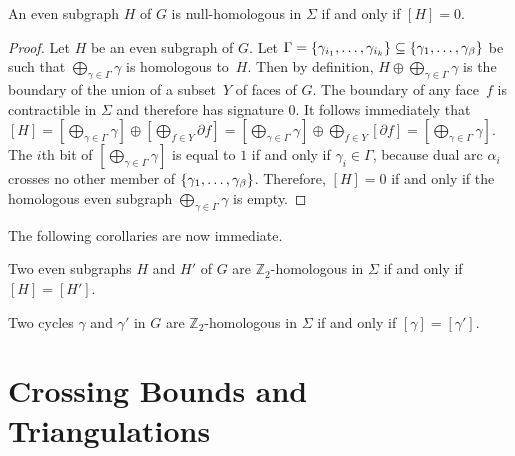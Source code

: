 \documentclass[letterpaper,review]{siamart190516}
\def\Z{\mathbb{Z}}
\def\cycle{\gamma}
\def\dualarc{\alpha}
\def\rnote#1{\color{red}Review: #1 \color{black}}
\def\knote#1{\textcolor{olive}{Kyle: #1}}
\begin{document}
\begin{lemma}
An even subgraph $H$ of $G$ is null-homologous in $\Sigma$ if and only if $[H] = 0$.
\end{lemma}

\begin{proof}

Let $H$ be an even subgraph of $G$.
Let \(\Gamma = \Set{\cycle_{i_1}, \dots, \cycle_{i_k}} \subseteq \Set{\cycle_1, \dots,
\cycle_\beta}\) be such that \(\bigoplus_{\cycle \in \Gamma} \cycle\) is homologous to~\(H\).
Then by definition, $H \oplus \bigoplus_{\cycle \in \Gamma} \cycle$ is the boundary of the union of
a subset~$Y$ of faces of $G$.
The boundary of any face~$f$ is contractible in $\Sigma$ and therefore has signature $0$.
It follows immediately that $[H] = [\bigoplus_{\cycle \in \Gamma} \cycle] \oplus [\bigoplus_{f\in Y}
\partial f] = [\bigoplus_{\cycle \in \Gamma} \cycle] \oplus \bigoplus_{f\in Y} [\partial f] =
[\bigoplus_{\cycle \in \Gamma} \cycle]$.
The \(i\)th bit of \([\bigoplus_{\cycle \in \Gamma} \cycle]\) is equal to \(1\) if and only if
\(\gamma_i \in \Gamma\), because dual arc \(\dualarc_i\) crosses no other member of \(\Set{\cycle_1,
\dots, \cycle_\beta}\).
Therefore, \([H] = 0\) if and only if the homologous even subgraph \(\bigoplus_{\cycle \in \Gamma}
\cycle\) is empty.
\end{proof}

The following corollaries are now immediate.

\begin{corollary}
Two even subgraphs $H$ and $H'$ of $G$ are $\Z_2$-homologous in $\Sigma$ if and only if $[H] = [H']$.
\end{corollary}

\begin{corollary}
Two cycles $\cycle$ and $\cycle'$ in $G$ are $\Z_2$-homologous in $\Sigma$ if and only if $[\cycle] = [\cycle']$.
\end{corollary}

\section{Crossing Bounds and Triangulations}
\label{sec:crossing}
\end{document}
